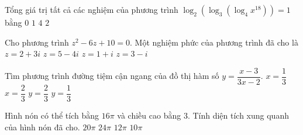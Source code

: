 \begin{ex}%
	Tổng giá trị tất cả các nghiệm của phương trình $\log_2 \left( \log_3 \left( \log_4 x^{18} \right) \right) =1$ bằng
	\choice
	{\True $0$}
	{$1$}
	{$4$}
	{$2$}
\end{ex}

\begin{ex}%
	Cho phương trình $z^2-6z+10=0$. Một nghiệm phức của phương trình đã cho là
	\choice
	{$z=2+3i$}
	{$z=5-4i$}
	{$z=1+i$}
	{\True $z=3-i$}
\end{ex}

\begin{ex}%
	Tìm phương trình đường tiệm cận ngang của đồ thị hàm số $y=\dfrac{x-3}{3x-2}$.
	\choice
	{$x=\dfrac{1}{3}$}
	{$x=\dfrac{2}{3}$}
	{$y=\dfrac{2}{3}$}
	{\True $y=\dfrac{1}{3}$}
\end{ex}

\begin{ex}%
	Hình nón có thể tích bằng $16\pi$ và chiều cao bằng $3$. Tính diện tích xung quanh của hình nón đã cho.
	\choice
	{\True $20\pi$}
	{$24\pi$}
	{$12\pi$}
	{$10\pi$}
\end{ex}


